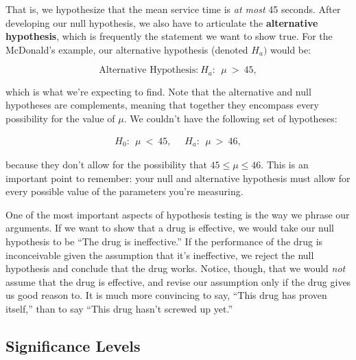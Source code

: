 That is, we hypothesize that the mean service time is \emph{at most} 45 seconds. After developing our null hypothesis, we also have to articulate the \textbf{alternative hypothesis}, which is frequently the statement we want to show true. For the McDonald's example, our alternative hypothesis (denoted $H_{a})$ would be:

\begin{equation*}

\textrm{Alternative Hypothesis:}\ H_a:\ \ \mu \ > \ 45,

\end{equation*}

which is what we're expecting to find. Note that the alternative and null hypotheses are complements, meaning that together they encompass every possibility for the value of $\mu$. We couldn't have the following set of hypotheses:

\begin{eqnarray}

H_0:\ \ \mu \ <\ 45, \ \ \ \ \ \ H_a:\ \ \mu\ >\ 46,

\end{eqnarray}

because they don't allow for the possibility that $45\le \mu \le 46$. This is an important point to remember: your null and alternative hypothesis must allow for every possible value of the parameters you're measuring.



One of the most important aspects of hypothesis testing is the way we phrase our arguments.  If we want to show that a drug is effective, we would take our null hypothesis to be ``The drug is ineffective.''  If the performance of the drug is inconceivable given the assumption that it's ineffective, we reject the null hypothesis and conclude that the drug works.  Notice, though, that we would \emph{not} assume that the drug is effective, and revise our assumption only if the drug gives us good reason to.  It is much more convincing to say, ``This drug has proven itself,'' than to say ``This drug hasn't screwed up yet.''







\subsection{Significance Levels}




